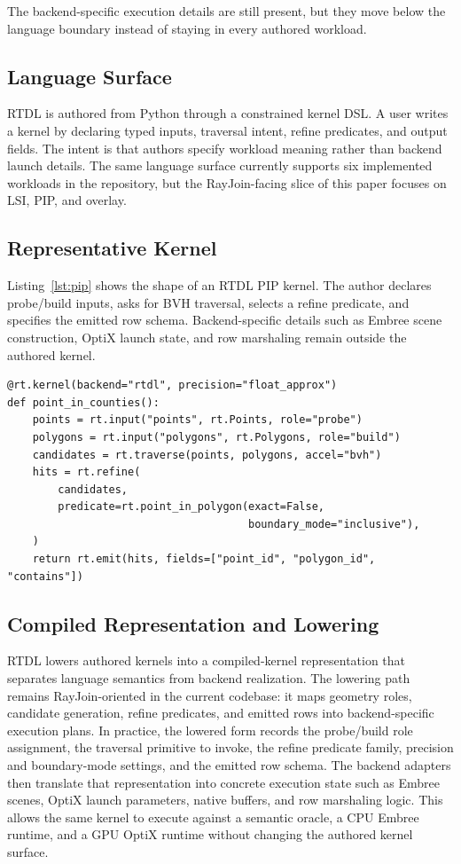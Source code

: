 \documentclass[conference]{IEEEtran}
\begin{document}
The backend-specific execution details are still present, but they move below
the language boundary instead of staying in every authored workload.

\subsection{Language Surface}

RTDL is authored from Python through a constrained kernel DSL. A user writes a
kernel by declaring typed inputs, traversal intent, refine predicates, and
output fields. The intent is that authors specify workload meaning rather than
backend launch details. The same language surface currently supports six
implemented workloads in the repository, but the RayJoin-facing slice of this
paper focuses on LSI, PIP, and overlay.

\subsection{Representative Kernel}

Listing~\ref{lst:pip} shows the shape of an RTDL PIP kernel. The author
declares probe/build inputs, asks for BVH traversal, selects a refine
predicate, and specifies the emitted row schema. Backend-specific details such
as Embree scene construction, OptiX launch state, and row marshaling remain
outside the authored kernel.

\begin{lstlisting}[caption={Representative RTDL PIP kernel.},label={lst:pip}]
@rt.kernel(backend="rtdl", precision="float_approx")
def point_in_counties():
    points = rt.input("points", rt.Points, role="probe")
    polygons = rt.input("polygons", rt.Polygons, role="build")
    candidates = rt.traverse(points, polygons, accel="bvh")
    hits = rt.refine(
        candidates,
        predicate=rt.point_in_polygon(exact=False,
                                      boundary_mode="inclusive"),
    )
    return rt.emit(hits, fields=["point_id", "polygon_id", "contains"])
\end{lstlisting}

\subsection{Compiled Representation and Lowering}

RTDL lowers authored kernels into a compiled-kernel representation that
separates language semantics from backend realization. The lowering path remains
RayJoin-oriented in the current codebase: it maps geometry roles, candidate
generation, refine predicates, and emitted rows into backend-specific execution
plans. In practice, the lowered form records the probe/build role assignment,
the traversal primitive to invoke, the refine predicate family, precision and
boundary-mode settings, and the emitted row schema. The backend adapters then
translate that representation into concrete execution state such as Embree
scenes, OptiX launch parameters, native buffers, and row marshaling logic. This
allows the same kernel to execute against a semantic oracle, a CPU Embree
runtime, and a GPU OptiX runtime without changing the authored kernel surface.
\end{document}
